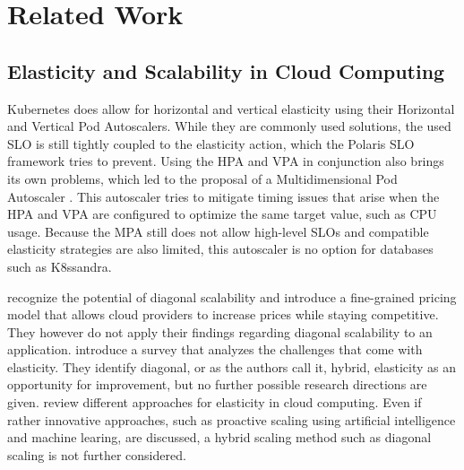 \chapter{Related Work}
\label{ch:related-work}

\section{Elasticity and Scalability in Cloud Computing}


Kubernetes does allow for horizontal and vertical elasticity using their Horizontal and Vertical Pod Autoscalers\cite{thekubernetesauthorsHorizontalPodAutoscaling,thekubernetesauthorsVerticalPodAutoscaler}. While they are commonly used solutions, the used SLO is still tightly coupled to the elasticity action, which the Polaris SLO framework tries to prevent. Using the HPA and VPA in conjunction also brings its own problems, which led to the proposal of a Multidimensional Pod Autoscaler \cite{thekubernetesauthorsMultidimensionalPodAutoscaler}. This autoscaler tries to mitigate timing issues that arise when the HPA and VPA are configured to optimize the same target value, such as CPU usage. Because the MPA still does not allow high-level SLOs and compatible elasticity strategies are also limited, this autoscaler is no option for databases such as K8ssandra.

\citeauthor{laubisCloudAdoptionFineGrained2016} \cite{laubisCloudAdoptionFineGrained2016} recognize the potential of diagonal scalability and introduce a fine-grained pricing model that allows cloud providers to increase prices while staying competitive. They however do not apply their findings regarding diagonal scalability to an application. \citeauthor{quAutoscalingWebApplications2017} \cite{quAutoscalingWebApplications2017} introduce a survey that analyzes the challenges that come with elasticity. They identify diagonal, or as the authors call it, hybrid, elasticity as an opportunity for improvement, but no further possible research directions are given. \citeauthor{al-dhuraibiElasticityCloudComputing2018} \cite{al-dhuraibiElasticityCloudComputing2018} review different approaches for elasticity in cloud computing. Even if rather innovative approaches, such as proactive scaling using artificial intelligence and machine learing, are discussed, a hybrid scaling method such as diagonal scaling is not further considered.


